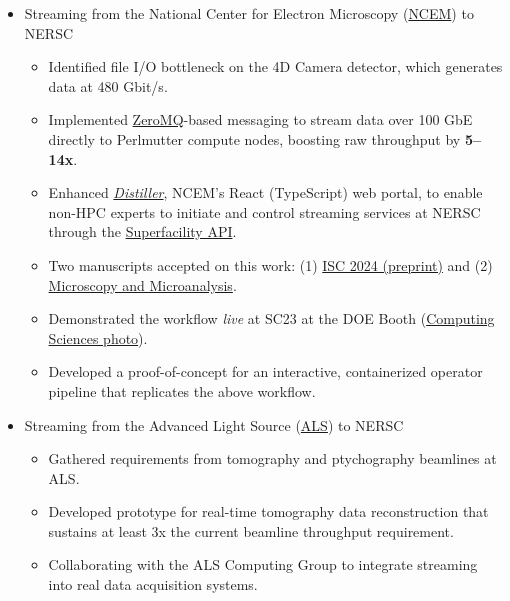 \documentclass[11pt]{article} %
\begin{document}
\begin{itemize}
  \item Streaming from the National Center for Electron Microscopy (\href{https://foundry.lbl.gov/about/facilities/the-national-center-for-electron-microscopy-ncem/}{NCEM}) to NERSC
    \begin{itemize}
      \item Identified file I/O bottleneck on the 4D Camera detector, which generates data at 480 Gbit/s.
      \item Implemented \href{https://zeromq.org/}{ZeroMQ}-based messaging to stream data over 100 GbE directly to Perlmutter compute nodes, boosting raw throughput by \textbf{5--14x}.
      \item Enhanced \textit{\href{https://github.com/OpenChemistry/distiller}{Distiller}}, NCEM's React (TypeScript) web portal, to enable non-HPC experts to initiate and control streaming services at NERSC through the \href{https://docs.nersc.gov/services/sfapi/}{Superfacility API}.\
      \item Two manuscripts accepted on this work: (1) \href{https://arxiv.org/abs/2403.14352}{ISC 2024 (preprint)} and (2) \href{https://doi.org/10.1093/mam/ozae109}{Microscopy and Microanalysis}.
      \item Demonstrated the workflow \textit{live} at SC23 at the DOE Booth (\href{https://media.licdn.com/dms/image/v2/D5622AQGfyrY4f3aUZA/feedshare-shrink_2048_1536/feedshare-shrink_2048_1536/0/1700156147009?e=1733356800&v=beta&t=e2Myg_yb3r7hLHQsPGJYdi67cq30veIGsyed4i8dZ5s}{Computing Sciences photo}).
      \item Developed a proof-of-concept for an interactive, containerized operator pipeline that replicates the above workflow.
    \end{itemize}

  \item Streaming from the Advanced Light Source (\href{https://als.lbl.gov/}{ALS}) to NERSC
    \begin{itemize}
      \item Gathered requirements from tomography and ptychography beamlines at ALS.\
      \item Developed prototype for real-time tomography data reconstruction that sustains at least 3x the current beamline throughput requirement.
      \item Collaborating with the ALS Computing Group to integrate streaming into real data acquisition systems.
    \end{itemize}
    \newpage


\end{itemize}
\end{document}
